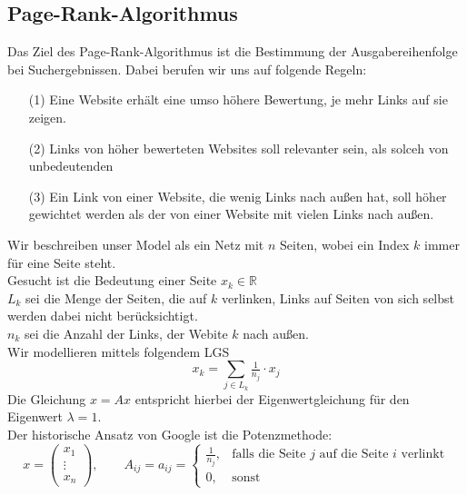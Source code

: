 \subsection{Page-Rank-Algorithmus}
Das Ziel des Page-Rank-Algorithmus ist die Bestimmung der Ausgabereihenfolge bei Suchergebnissen. Dabei berufen 
wir uns auf folgende Regeln:
\begin{enumerate}
    \item[(1)] Eine Website erhält eine umso höhere Bewertung, je mehr Links auf sie zeigen.
    \item[(2)] Links von höher bewerteten Websites soll relevanter sein, als solceh von unbedeutenden
    \item[(3)] Ein Link von einer Website, die wenig Links nach außen hat, soll höher gewichtet werden als der
        von einer Website mit vielen Links nach außen. 
\end{enumerate}
Wir beschreiben unser Model als ein Netz mit $n$ Seiten, wobei ein Index $k$ immer für eine Seite steht. \\
Gesucht ist die Bedeutung einer Seite $x_k\in\mathbb{R}$ \\
$L_k$ sei die Menge der Seiten, die auf $k$ verlinken, Links auf Seiten von sich selbst werden dabei nicht
berücksichtigt. \\
$n_k$ sei die Anzahl der Links, der Webite $k$ nach außen.\\
Wir modellieren mittels folgendem LGS
\[x_k = \sum_{j\in L_k}\tfrac{1}{n_j}\cdot x_j\]
Die Gleichung $x=Ax$ entspricht hierbei der Eigenwertgleichung für den Eigenwert $\lambda=1$. \\
Der historische Ansatz von Google ist die Potenzmethode:
\[x = \begin{pmatrix}
    x_1 \\ \vdots \\ x_n
\end{pmatrix}, \qquad A_{ij} = a_{ij} = \begin{cases}
    \tfrac{1}{n_j}, & \text{falls die Seite } j \text{ auf die Seite } i \text{ verlinkt} \\
    0, & \text{sonst}
\end{cases}\]
\newpage
